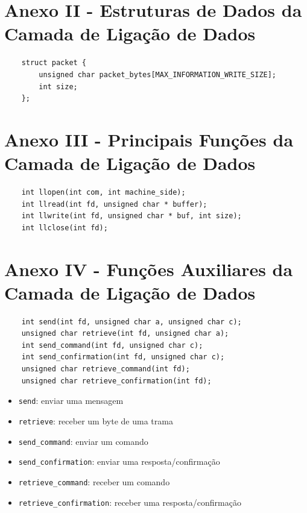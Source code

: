 \documentclass[article, a4paper, 11pt, oneside]{memoir}
\begin{document}
\newpage



\newpage



\newpage



\newpage

\section{Anexo II - Estruturas de Dados da Camada de Ligação de Dados}

\begin{lstlisting}
    struct packet {
        unsigned char packet_bytes[MAX_INFORMATION_WRITE_SIZE];
        int size;
    };
\end{lstlisting}

\section{Anexo III - Principais Funções da Camada de Ligação de Dados}

\begin{lstlisting}
    int llopen(int com, int machine_side);
    int llread(int fd, unsigned char * buffer);
    int llwrite(int fd, unsigned char * buf, int size);
    int llclose(int fd);
\end{lstlisting}

\section{Anexo IV - Funções Auxiliares da Camada de Ligação de Dados}
\begin{lstlisting}
    int send(int fd, unsigned char a, unsigned char c);
    unsigned char retrieve(int fd, unsigned char a);
    int send_command(int fd, unsigned char c);
    int send_confirmation(int fd, unsigned char c);
    unsigned char retrieve_command(int fd);
    unsigned char retrieve_confirmation(int fd);
\end{lstlisting}

\begin{itemize}
    \item \verb|send|: enviar uma mensagem
    \item \verb|retrieve|: receber um byte de uma trama
    \item \verb|send_command|: enviar um comando
    \item \verb|send_confirmation|: enviar uma resposta/confirmação
    \item \verb|retrieve_command|: receber um comando
    \item \verb|retrieve_confirmation|: receber uma resposta/confirmação
\end{itemize}
\end{document}
